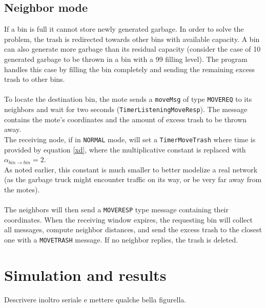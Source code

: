 \documentclass[a4paper,10pt]{article}
\begin{document}
\subsection{Neighbor mode}
If a bin is full it cannot store newly generated garbage. In order to solve the problem, the trash is redirected towards other bins with available capacity. A bin can also generate more garbage than its residual capacity (consider the case of 10 generated garbage to be thrown in a bin with a 99 filling level). The program handles this case by filling the bin completely and sending the remaining excess trash to other bins. \\ \\
To locate the destination bin, the mote sends a \texttt{moveMsg} of type \texttt{MOVEREQ} to its neighbors and wait for two seconds (\texttt{TimerListeningMoveResp}). The message contains the mote's coordinates and the amount of excess trash to be thrown away. \\The receiving node, if in \texttt{NORMAL} mode, will set a \texttt{TimerMoveTrash} where time is provided by equation \eqref{xd}, where the multiplicative constant is replaced with $\displaystyle \alpha_{bin\rightarrow bin} = 2$. \\As noted earlier, this constant is much smaller to better modelize a real network (as the garbage truck might encounter traffic on its way, or be very far away from the motes).\\\\
The neighbors will then send a \texttt{MOVERESP} type message containing their coordinates. When the receiving window expires, the requesting bin will collect all messages, compute neighbor distances, and send the excess trash to the closest one with a \texttt{MOVETRASH} message. If no neighbor replies, the trash is deleted.
\section{Simulation and results}
Descrivere inoltro seriale e mettere qualche bella figurella.
\end{document}
